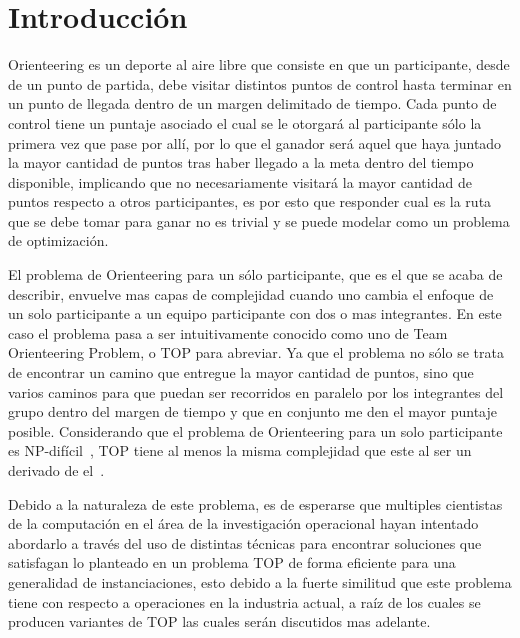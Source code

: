 \section{Introducci\'on}\label{intro}
Orienteering es un deporte al aire libre que consiste en que un participante, desde de un punto de partida, debe visitar distintos puntos de control hasta terminar en un punto de llegada dentro de un margen delimitado de tiempo. Cada punto de control tiene un puntaje asociado el cual se le otorgar\'a al participante s\'olo la primera vez que pase por all\'i, por lo que el ganador ser\'a aquel que haya juntado la mayor cantidad de puntos tras haber llegado a la meta dentro del tiempo disponible, implicando que no necesariamente visitar\'a la mayor cantidad de puntos respecto a otros participantes, es por esto que responder cual es la ruta que se debe tomar para ganar no es trivial y se puede modelar como un problema de optimizaci\'on.

El problema de Orienteering para un s\'olo participante, que es el que se acaba de describir, envuelve mas capas de complejidad cuando uno cambia el enfoque de un solo participante a un equipo participante con dos o mas integrantes. En este caso el problema pasa a ser intuitivamente conocido como uno de Team Orienteering Problem, o TOP para abreviar. Ya que el problema no s\'olo se trata de encontrar un camino que entregue la mayor cantidad de puntos, sino que varios caminos para que puedan ser recorridos en paralelo por los integrantes del grupo dentro del margen de tiempo y que en conjunto me den el mayor puntaje posible. Considerando que el problema de Orienteering para un solo participante es NP-dif\'icil~\cite{opComplex}, TOP tiene al menos la misma complejidad que este al ser un derivado de el~\cite{TOPresume}.

Debido a la naturaleza de este problema, es de esperarse que multiples cientistas de la computaci\'on en el \'area de la investigaci\'on operacional hayan intentado abordarlo a trav\'es del uso de distintas t\'ecnicas para encontrar soluciones que satisfagan lo planteado en un problema TOP de forma eficiente para una generalidad de instanciaciones, esto debido a la fuerte similitud que este problema tiene con respecto a operaciones en la industria actual, a ra\'iz de los cuales se producen variantes de TOP las cuales ser\'an discutidos mas adelante.

